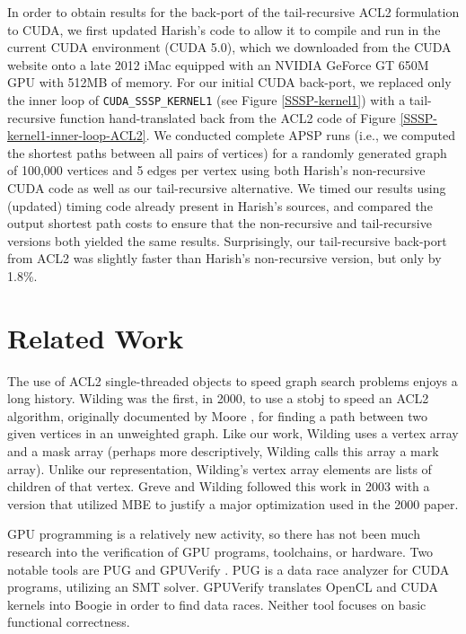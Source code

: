 \documentclass[copyright]{eptcs}
\begin{document}
In order to obtain results for the back-port of the
tail-recursive ACL2 formulation to CUDA, we first updated Harish's 
code \cite{HarishWeb} to allow it to compile and run in the current
CUDA environment (CUDA 5.0), which we downloaded from the CUDA 
website \cite{CUDA} onto a late 2012 iMac equipped with an 
NVIDIA GeForce GT 650M GPU with 512MB of memory.  
For our initial CUDA back-port, we replaced only the inner loop of 
\texttt{CUDA\_SSSP\_KERNEL1} (see Figure \ref{SSSP-kernel1}) with a 
tail-recursive function hand-translated back from the ACL2 code of Figure 
\ref{SSSP-kernel1-inner-loop-ACL2}.  We conducted complete 
APSP runs (i.e., we computed the shortest paths between all pairs of
vertices) for a randomly generated graph of 100,000 vertices and 5
edges per vertex using both Harish's non-recursive CUDA code 
as well as our tail-recursive alternative.  We timed our results using 
(updated) timing code already present in Harish's sources, and compared the 
output shortest path costs to ensure that the non-recursive 
and tail-recursive versions both yielded the same results.  Surprisingly,
our tail-recursive back-port from ACL2 was slightly faster than
Harish's non-recursive version, but only by 1.8\%.

\section{Related Work}

The use of ACL2 single-threaded objects to speed graph search problems
enjoys a long history.  Wilding \cite{Wilding00} was the
first, in 2000, to use a stobj to speed an ACL2 algorithm, originally
documented by Moore \cite{mooregraph}, for finding a
path between two given vertices in an unweighted graph.  
Like our work, Wilding uses a vertex array and a mask array (perhaps more
descriptively, Wilding calls this array a mark array).  Unlike our 
representation, Wilding's vertex array elements are lists of 
children of that vertex.  Greve and Wilding followed this work 
in 2003 \cite{WildingGreve03} with a version that utilized MBE to 
justify a major optimization used in the 2000 paper.

GPU programming is a relatively new activity, so there has not been 
much research into the verification of GPU programs, toolchains, 
or hardware.  Two notable tools are PUG \cite{PUG}  and GPUVerify
\cite{GPUVerify}.  PUG is a data race analyzer for  CUDA programs, 
utilizing an SMT solver.  GPUVerify translates OpenCL and CUDA 
kernels into Boogie \cite{Boogie} in order to find data races.  
Neither tool focuses on basic functional correctness.
\end{document}
